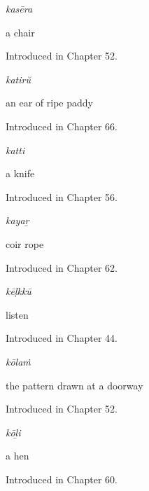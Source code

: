 \noindent\begin{minipage}[t]{\linewidth}
\raggedright
\textbf{}\enspace\emph{kasēra}\par
\small a chair\par
\footnotesize Introduced in Chapter 52.
\end{minipage}\par\medskip

\noindent\begin{minipage}[t]{\linewidth}
\raggedright
\textbf{}\enspace\emph{katirŭ}\par
\small an ear of ripe paddy\par
\footnotesize Introduced in Chapter 66.
\end{minipage}\par\medskip

\noindent\begin{minipage}[t]{\linewidth}
\raggedright
\textbf{}\enspace\emph{katti}\par
\small a knife\par
\footnotesize Introduced in Chapter 56.
\end{minipage}\par\medskip

\noindent\begin{minipage}[t]{\linewidth}
\raggedright
\textbf{}\enspace\emph{kayaṟ}\par
\small coir rope\par
\footnotesize Introduced in Chapter 62.
\end{minipage}\par\medskip

\noindent\begin{minipage}[t]{\linewidth}
\raggedright
\textbf{}\enspace\emph{kēḷkkū}\par
\small listen\par
\footnotesize Introduced in Chapter 44.
\end{minipage}\par\medskip

\noindent\begin{minipage}[t]{\linewidth}
\raggedright
\textbf{}\enspace\emph{kōlaṁ}\par
\small the pattern drawn at a doorway\par
\footnotesize Introduced in Chapter 52.
\end{minipage}\par\medskip

\noindent\begin{minipage}[t]{\linewidth}
\raggedright
\textbf{}\enspace\emph{kōḻi}\par
\small a hen\par
\footnotesize Introduced in Chapter 60.
\end{minipage}\par\medskip

